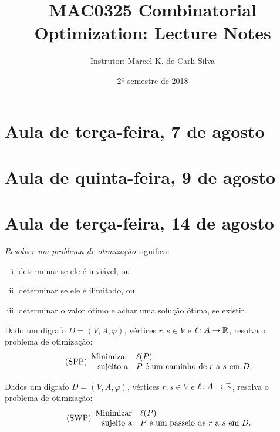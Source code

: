\documentclass[10pt,reqno]{amsart}
\title{MAC0325 Combinatorial Optimization: Lecture Notes}
\author{Instrutor: Marcel {K.} de Carli Silva}
\date{2º semestre de 2018}
\begin{document}
\begin{abstract}

\end{abstract}

\maketitle

\tableofcontents

\section{Aula de terça-feira, 7 de agosto}

\section{Aula de quinta-feira, 9 de agosto}

\section{Aula de terça-feira, 14 de agosto}

\emph{Resolver um problema de otimização} significa:
\begin{enumerate}[(i)]
\item determinar se ele é inviável, ou
\item determinar se ele é ilimitado, ou
\item determinar o valor ótimo e achar uma solução ótima, se existir.
\end{enumerate}

\begin{problem*}
  Dado um digrafo \(D = (V,A,\varphi)\), vértices \(r,s \in V\) e
  \(\ell \colon A \to \mathbb{R}\), resolva o problema de otimização:
  \begin{equation}
    \label{eq:1}
    \tag{SPP}
    \begin{array}{{rl}}
      \text{Minimizar} & \ell(P) \\
      \text{sujeito a} & \text{\(P\) é um caminho de \(r\) a \(s\) em~\(D\)}.
    \end{array}
  \end{equation}
\end{problem*}

\begin{problem*}
  Dados um digrafo \(D = (V,A,\varphi)\), vértices \(r,s \in V\) e
  \(\ell \colon A \to \mathbb{R}\), resolva o problema de otimização:
  \begin{equation}
    \label{eq:2}
    \tag{SWP}
    \begin{array}{{rl}}
      \text{Minimizar}   & \ell(P) \\
      \text{sujeito a} & \text{\(P\) é um passeio de \(r\) a \(s\) em~\(D\)}.
    \end{array}
  \end{equation}
\end{problem*}
\end{document}
